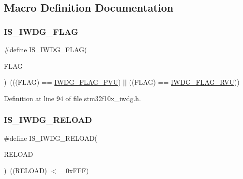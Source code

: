 \subsection{Macro Definition Documentation}
\mbox{\label{group___i_w_d_g___flag_ga5be9ae9ba267cf09a00523ef3e219293}} 
\subsubsection{\texorpdfstring{I\+S\+\_\+\+I\+W\+D\+G\+\_\+\+F\+L\+AG}{IS\_IWDG\_FLAG}}
{\footnotesize\ttfamily \#define I\+S\+\_\+\+I\+W\+D\+G\+\_\+\+F\+L\+AG(\begin{DoxyParamCaption}\item[{}]{F\+L\+AG }\end{DoxyParamCaption})~(((F\+L\+AG) == \hyperlink{group___i_w_d_g___flag_gae20afcf399fad1534e79a8d30ea86c9c}{I\+W\+D\+G\+\_\+\+F\+L\+A\+G\+\_\+\+P\+VU}) $\vert$$\vert$ ((F\+L\+AG) == \hyperlink{group___i_w_d_g___flag_ga3731bf2711c234ffe5b405fb6634ebca}{I\+W\+D\+G\+\_\+\+F\+L\+A\+G\+\_\+\+R\+VU}))}



Definition at line 94 of file stm32f10x\+\_\+iwdg.\+h.

\mbox{\label{group___i_w_d_g___flag_ga7c319e96bded8e3c38c6a42a1b335c68}} 
\subsubsection{\texorpdfstring{I\+S\+\_\+\+I\+W\+D\+G\+\_\+\+R\+E\+L\+O\+AD}{IS\_IWDG\_RELOAD}}
{\footnotesize\ttfamily \#define I\+S\+\_\+\+I\+W\+D\+G\+\_\+\+R\+E\+L\+O\+AD(\begin{DoxyParamCaption}\item[{}]{R\+E\+L\+O\+AD }\end{DoxyParamCaption})~((R\+E\+L\+O\+AD) $<$= 0x\+F\+F\+F)}




